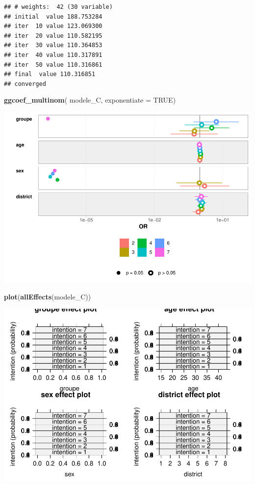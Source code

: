 \documentclass[
]{article}
\newenvironment{Shaded}{\begin{snugshade}}{\end{snugshade}}
\newcommand{\AttributeTok}[1]{\textcolor[rgb]{0.13,0.29,0.53}{#1}}
\newcommand{\ConstantTok}[1]{\textcolor[rgb]{0.56,0.35,0.01}{#1}}
\newcommand{\FunctionTok}[1]{\textcolor[rgb]{0.13,0.29,0.53}{\textbf{#1}}}
\newcommand{\NormalTok}[1]{#1}
\begin{document}
\begin{verbatim}
## # weights:  42 (30 variable)
## initial  value 188.753284 
## iter  10 value 123.069300
## iter  20 value 110.582195
## iter  30 value 110.364853
## iter  40 value 110.317891
## iter  50 value 110.316861
## final  value 110.316851 
## converged
\end{verbatim}

\begin{Shaded}
\begin{Highlighting}[]
\FunctionTok{ggcoef\_multinom}\NormalTok{(}
\NormalTok{  modele\_C,}
  \AttributeTok{exponentiate =} \ConstantTok{TRUE}\NormalTok{)}
\end{Highlighting}
\end{Shaded}

\includegraphics{RMarkdown_files/figure-latex/unnamed-chunk-32-1.pdf}

\begin{Shaded}
\begin{Highlighting}[]
\FunctionTok{plot}\NormalTok{(}\FunctionTok{allEffects}\NormalTok{(modele\_C))}
\end{Highlighting}
\end{Shaded}

\includegraphics{RMarkdown_files/figure-latex/unnamed-chunk-32-2.pdf}
\end{document}
